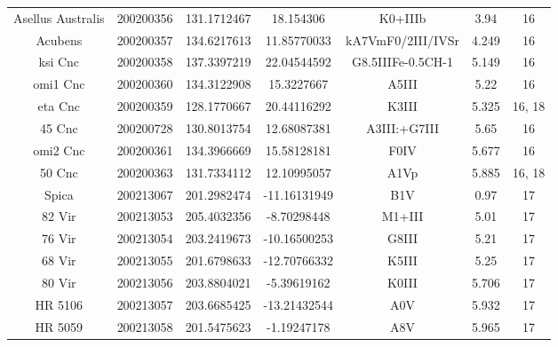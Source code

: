 \begin{table*}
\begin{tabular}{ccccccc}
Asellus Australis & 200200356 & 131.1712467 & 18.154306 & K0+IIIb & 3.94 & 16 \\
Acubens & 200200357 & 134.6217613 & 11.85770033 & kA7VmF0/2III/IVSr & 4.249 & 16 \\
ksi Cnc & 200200358 & 137.3397219 & 22.04544592 & G8.5IIIFe-0.5CH-1 & 5.149 & 16 \\
omi1 Cnc & 200200360 & 134.3122908 & 15.3227667 & A5III & 5.22 & 16 \\
eta Cnc & 200200359 & 128.1770667 & 20.44116292 & K3III & 5.325 & 16, 18 \\
45 Cnc & 200200728 & 130.8013754 & 12.68087381 & A3III:+G7III & 5.65 & 16 \\
omi2 Cnc & 200200361 & 134.3966669 & 15.58128181 & F0IV & 5.677 & 16 \\
50 Cnc & 200200363 & 131.7334112 & 12.10995057 & A1Vp & 5.885 & 16, 18 \\
Spica & 200213067 & 201.2982474 & -11.16131949 & B1V & 0.97 & 17 \\
82 Vir & 200213053 & 205.4032356 & -8.70298448 & M1+III & 5.01 & 17 \\
76 Vir & 200213054 & 203.2419673 & -10.16500253 & G8III & 5.21 & 17 \\
68 Vir & 200213055 & 201.6798633 & -12.70766332 & K5III & 5.25 & 17 \\
80 Vir & 200213056 & 203.8804021 & -5.39619162 & K0III & 5.706 & 17 \\
HR 5106 & 200213057 & 203.6685425 & -13.21432544 & A0V & 5.932 & 17 \\
HR 5059 & 200213058 & 201.5475623 & -1.19247178 & A8V & 5.965 & 17 \\
\hline
\end{tabular}
\end{table*}
